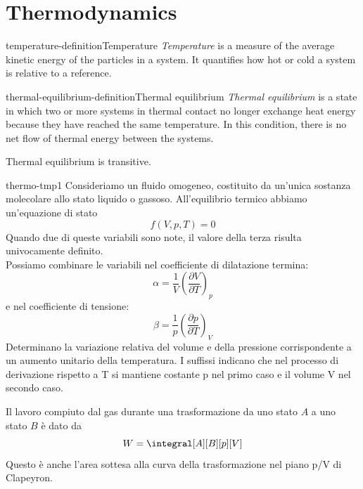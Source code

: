 \documentclass[preview]{standalone}
\begin{document}
\genpage

\section{Thermodynamics}

\begin{snippetdefinition}{temperature-definition}{Temperature}
    \emph{Temperature} is a measure of the average kinetic energy of the particles in a system. It quantifies how hot or cold a system is relative to a reference.
\end{snippetdefinition}

\begin{snippetdefinition}{thermal-equilibrium-definition}{Thermal equilibrium}
    \emph{Thermal equilibrium} is a state in which two or
    more systems in thermal contact no longer exchange heat energy
    because they have reached the same temperature.
    In this condition, there is no net flow of thermal energy between the systems.
\end{snippetdefinition}

\begin{plainhtml}
    Thermal equilibrium is transitive.
\end{plainhtml}

\begin{snippet}{thermo-tmp1}
    Consideriamo un fluido omogeneo, costituito da un'unica sostanza
    molecolare allo stato liquido o gassoso.
    All'equilibrio termico abbiamo un'equazione di stato
    \[
        f(V, p, T) = 0
    \]
    Quando due di queste variabili sono note, il valore della terza risulta univocamente definito.
    \\
    Possiamo combinare le variabili nel coefficiente di
    dilatazione termina:
    \[
        \alpha = \frac{1}{V} {\left(\frac{\partial V}{\partial T}\right)}_p
    \]
    e nel coefficiente di tensione:
    \[
        \beta = \frac{1}{p} {\left(\frac{\partial p}{\partial T}\right)}_V
    \]
    Determinano la variazione relativa del volume e della pressione corrispondente a un
    aumento unitario della temperatura. I suffissi indicano che nel processo di derivazione
    rispetto a T si mantiene costante p nel primo caso e il volume V nel secondo caso.

    Il lavoro compiuto dal gas durante una trasformazione
    da uno stato \(A\) a uno stato \(B\) è dato da
    \[
        W = \integral[A][B][p][V]
    \]
    Questo è anche l'area sottesa alla curva della trasformazione nel piano p/V di Clapeyron.
\end{snippet}
\end{document}
